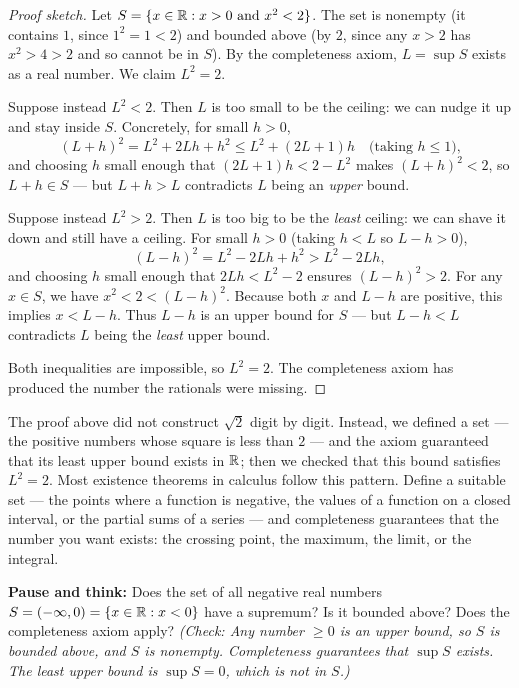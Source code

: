 \begin{proof}[Proof sketch]
Let $S = \{x\in\mathbb{R} : x > 0 \text{ and } x^2 < 2\}$. The set is nonempty (it contains $1$,
since $1^2=1<2$) and bounded above (by $2$, since any $x>2$ has $x^2>4>2$ and so cannot be
in $S$). By the completeness axiom, $L=\sup S$ exists as a real number. We claim $L^2=2$.

Suppose instead $L^2 < 2$. Then $L$ is too small to be the ceiling: we can nudge it up and
stay inside $S$. Concretely, for small $h>0$,
\[
  (L+h)^2 = L^2 + 2Lh + h^2 \le L^2 + (2L+1)h \quad\text{(taking $h\le 1$),}
\]
and choosing $h$ small enough that $(2L+1)h < 2 - L^2$ makes $(L+h)^2 < 2$, so
$L+h\in S$ --- but $L+h>L$ contradicts $L$ being an \emph{upper} bound.

Suppose instead $L^2 > 2$. Then $L$ is too big to be the \emph{least} ceiling: we can
shave it down and still have a ceiling. For small $h>0$ (taking $h < L$ so $L-h > 0$),
\[
  (L-h)^2 = L^2 - 2Lh + h^2 > L^2 - 2Lh,
\]
and choosing $h$ small enough that $2Lh < L^2 - 2$ ensures $(L-h)^2 > 2$. For any $x\in S$,
we have $x^2 < 2 < (L-h)^2$. Because both $x$ and $L-h$ are positive, this implies $x < L-h$.
Thus $L-h$ is an upper bound for $S$ --- but $L-h<L$ contradicts $L$ being the \emph{least}
upper bound.

Both inequalities are impossible, so $L^2 = 2$. The completeness axiom has produced the
number the rationals were missing.
\end{proof}

\begin{aestheticbox}
The proof above did not
construct $\sqrt 2$ digit by digit. Instead, we defined a set --- the positive
numbers whose square is less than $2$ --- and the axiom guaranteed that its least
upper bound exists in $\mathbb{R}$; then we checked that this bound satisfies $L^2 = 2$.
Most existence theorems in calculus
follow this pattern. Define a suitable set --- the points where a function is
negative, the values of a function on a closed interval, or the partial sums of a series ---
and completeness guarantees that the number you want exists: the crossing point,
the maximum, the limit, or the integral.
\end{aestheticbox}

\begin{recoverybox}
\textbf{Pause and think:} Does the set of all negative real numbers $S = (-\infty, 0) = \{x \in \mathbb{R} : x < 0\}$ have a supremum? Is it bounded above? Does the completeness axiom apply?
\emph{(Check: Any number $\ge 0$ is an upper bound, so $S$ is bounded above, and $S$ is nonempty. Completeness guarantees that $\sup S$ exists. The least upper bound is $\sup S = 0$, which is not in $S$.)}
\end{recoverybox}

